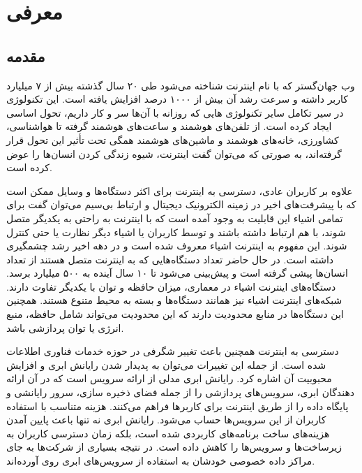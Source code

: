 \chapter{معرفی}

\section{مقدمه‌}

وب جهان‌گستر که با نام اینترنت شناخته می‌شود طی ۲۰ سال گذشته بیش از ۷ میلیارد کاربر داشته و سرعت رشد آن بیش از ۱۰۰۰ درصد افزایش یافته است. این تکنولوژی در سیر تکامل سایر تکنولوژی هایی که روزانه با آن‌ها سر و کار داریم، تحول اساسی ایجاد کرده است. از تلفن‌های هوشمند و ساعت‌های هوشمند گرفته تا هواشناسی، کشاورزی، خانه‌های هوشمند و ماشین‌های هوشمند همگی تحت تأثیر این تحول قرار گرفته‌اند، به صورتی که می‌توان گفت اینترنت، شیوه زندگی کردن انسان‌ها را عوض کرده ‌است.

علاوه‌ بر کاربران عادی، دسترسی به اینترنت برای اکثر دستگاه‌ها و وسایل ممکن است که با پیشرفت‌های اخیر در زمینه الکترونیک دیجیتال و ارتباط بی‌سیم می‌توان گفت برای تمامی اشیاء این قابلیت به وجود آمده است که با اینترنت به راحتی به یکدیگر متصل شوند، با هم ارتباط داشته باشند و توسط کاربران یا اشیاء دیگر نظارت یا حتی کنترل شوند. این مفهوم به اینترنت اشیاء معروف شده است و در دهه اخیر رشد چشمگیری داشته است. در حال حاضر تعداد دستگاه‌هایی که به اینترنت متصل هستند از تعداد انسان‌ها پیشی گرفته است و پیش‌بینی می‌شود تا ۱۰ سال آینده به ۵۰۰ میلیارد برسد. دستگاه‌های اینترنت اشیاء در معماری، میزان حافظه و توان با یکدیگر تفاوت دارند. شبکه‌های اینترنت اشیاء نیز همانند دستگاه‌ها و بسته به محیط متنوع هستند. همچنین این دستگاه‌ها در منابع محدودیت دارند که این محدودیت می‌تواند شامل حافظه، منبع انرژی یا توان پردازشی باشد.

دسترسی به اینترنت همچنین باعث تغییر شگرفی در حوزه خدمات فناوری اطلاعات شده است. از جمله این تغییرات می‌توان به پدیدار شدن رایانش ابری و افزایش محبوبیت آن اشاره کرد. رایانش ابری مدلی از ارائه سرویس است که در آن ارائه دهندگان ابری، سرویس‌های پردازشی را از جمله فضای ذخیره سازی، سرور‌ رایانشی و پایگاه داده‌ را از طریق اینترنت برای کاربر‌ها فراهم می‌کنند. هزینه متناسب با استفاده کاربران از این سرویس‌ها حساب می‌شود. رایانش ابری نه تنها باعث پایین آمدن هزینه‌های ساخت برنامه‌های کاربردی شده است، بلکه زمان دسترسی کاربران به زیرساخت‌ها و سرویس‌ها را کاهش داده است. در نتیجه بسیاری از شرکت‌ها به جای مراکز داده خصوصی خودشان به استفاده از سرویس‌های ابری روی آورده‌اند.
\cite{Kumar_2018}

\newpage

